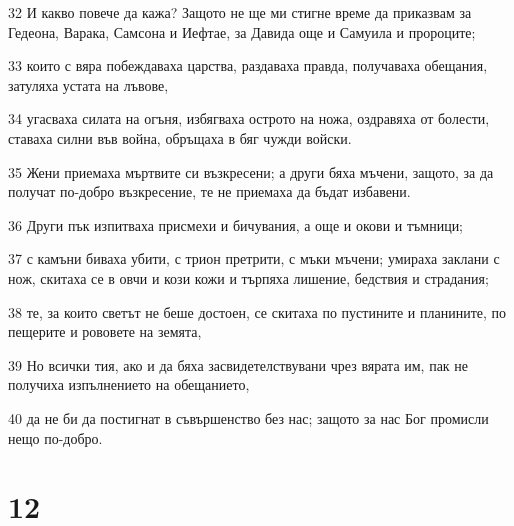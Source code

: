 \par 32 И какво повече да кажа? Защото не ще ми стигне време да приказвам за Гедеона, Варака, Самсона и Иефтае, за Давида още и Самуила и пророците;
\par 33 които с вяра побеждаваха царства, раздаваха правда, получаваха обещания, затуляха устата на лъвове,
\par 34 угасваха силата на огъня, избягваха острото на ножа, оздравяха от болести, ставаха силни във война, обръщаха в бяг чужди войски.
\par 35 Жени приемаха мъртвите си възкресени; а други бяха мъчени, защото, за да получат по-добро възкресение, те не приемаха да бъдат избавени.
\par 36 Други пък изпитваха присмехи и бичувания, а още и окови и тъмници;
\par 37 с камъни биваха убити, с трион претрити, с мъки мъчени; умираха заклани с нож, скитаха се в овчи и кози кожи и търпяха лишение, бедствия и страдания;
\par 38 те, за които светът не беше достоен, се скитаха по пустините и планините, по пещерите и рововете на земята,
\par 39 Но всички тия, ако и да бяха засвидетелствувани чрез вярата им, пак не получиха изпълнението на обещанието,
\par 40 да не би да постигнат в съвършенство без нас; защото за нас Бог промисли нещо по-добро.

\chapter{12}

